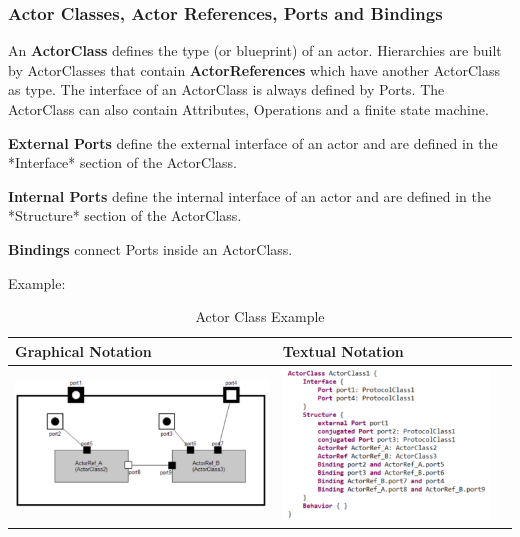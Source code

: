 \subsubsection{Actor Classes, Actor References, Ports and Bindings}

An \textbf{ActorClass} defines the type (or blueprint) of an actor. Hierarchies are built by ActorClasses 
that contain \textbf{ActorReferences} which have another ActorClass as type. The interface of an 
ActorClass is always defined by Ports. The ActorClass can also contain Attributes, Operations and a finite 
state machine. 

\textbf{External Ports} define the external interface of an actor and are defined in the *Interface* 
section of the ActorClass.

\textbf{Internal Ports} define the internal interface of an actor and are defined in the *Structure* 
section of the ActorClass.

\textbf{Bindings} connect Ports inside an ActorClass.

Example:

\begin{table}
\caption{Actor Class Example}
\begin{tabular}{|l|l|l|}
\hline
 \textbf{Graphical Notation} & \textbf{Textual Notation} \\ \hline
 \includegraphics[scale=0.7]{images/040-ActorClass.png} & 
\includegraphics[scale=0.7]{images/040-ActorClassExampleTextualNotation.png} \\ \hline
 \end{tabular}
 \end{table}
 
